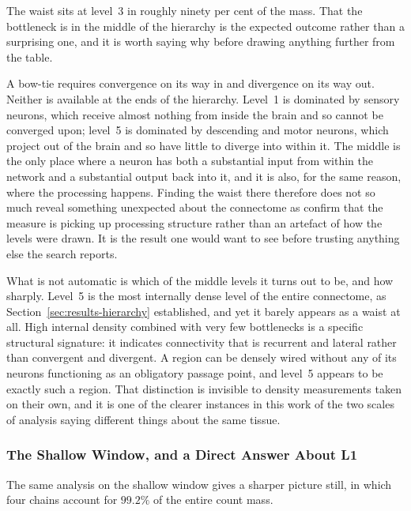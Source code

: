 \documentclass[12pt,a4paper,oneside]{article}
\theoremstyle{definition}
\theoremstyle{plain}
\begin{document}
The waist sits at level~3 in roughly ninety per cent of the mass. That the
bottleneck is in the middle of the hierarchy is the expected outcome rather
than a surprising one, and it is worth saying why before drawing anything
further from the table.

A bow-tie requires convergence on its way in and divergence on its way out.
Neither is available at the ends of the hierarchy. Level~1 is dominated by
sensory neurons, which receive almost nothing from inside the brain and so
cannot be converged upon; level~5 is dominated by descending and motor
neurons, which project out of the brain and so have little to diverge into
within it. The middle is the only place where a neuron has both a substantial
input from within the network and a substantial output back into it, and it
is also, for the same reason, where the processing happens. Finding the waist
there therefore does not so much reveal something unexpected about the
connectome as confirm that the measure is picking up processing structure
rather than an artefact of how the levels were drawn. It is the result one
would want to see before trusting anything else the search reports.

What is not automatic is which of the middle levels it turns out to be, and
how sharply. Level~5 is the most internally dense level of the entire
connectome, as Section~\ref{sec:results-hierarchy} established, and yet it
barely appears as a waist at all. High internal density combined with very
few bottlenecks is a specific structural signature: it indicates connectivity
that is recurrent and lateral rather than convergent and divergent. A region
can be densely wired without any of its neurons functioning as an obligatory
passage point, and level~5 appears to be exactly such a region. That
distinction is invisible to density measurements taken on their own, and it
is one of the clearer instances in this work of the two scales of analysis
saying different things about the same tissue.

\subsubsection{The Shallow Window, and a Direct Answer About L1}

The same analysis on the shallow window gives a sharper picture still, in
which four chains account for $99.2\%$ of the entire count mass.
\end{document}
